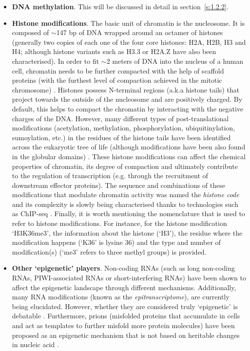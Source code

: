 \begin{itemize}
	
	\item \textbf{DNA methylation}. This will be discussed in detail in section~\ref{s:1.2.2}.
	
	\item \textbf{Histone modifications}. The basic unit of chromatin is the nucleosome. It is composed of $\sim$147 \acrshort{bp} of DNA wrapped around an octamer of histones (generally two copies of each one of the four core histones: H2A, H2B, H3 and H4; although histone variants such as H3.3 or H2A.Z have also been characterised). In order to fit  $\sim$2 meters of DNA into the nucleus of a human cell, chromatin needs to be further compacted with the help of scaffold proteins (with the furthest level of compaction achieved in the mitotic chromosome) \citep{Ou2017}. Histones possess N-terminal regions (a.k.a histone tails) that project towards the outside of the nucleosome and are positively charged. By default, this helps to compact the chromatin by interacting with the negative charges of the DNA. However, many different types of post-translational modifications (acetylation, methylation, phosphorylation, ubiquitinylation, sumoylation, etc.) in the residues of the histone tails have been identified across the eukaryotic tree of life (although modifications have been also found in the globular domains) \citep{Lawrence2016}. These histone modifications can affect the chemical properties of chromatin, its degree of compaction and ultimately contribute to the regulation of transcription (e.g. through the recruitment of downstream effector proteins). The sequence and combinations of these modifications that modulate chromatin activity was named the \textit{histone code} \citep{Strahl2000} and its complexity is slowly being characterised thanks to technologies such as \acrshort{ChIP-seq} \citep{Consortium2012, Consortium2015}. Finally, it is worth mentioning the nomenclature that is used to refer to histone modifications. For instance, for the histone modification `H3K36me3', the information about the histone (`H3'), the residue where the modification happens (`K36' is lysine 36) and the type and number of modification(s) (`me3' refers to three methyl groups) is provided.

	\item \textbf{Other `epigenetic' players}. Non-coding RNAs (such as long non-coding RNAs, PIWI-associated RNAs or short-interfering RNAs) have been shown to affect the epigenetic landscape through different mechanisms. Additionally, many RNA modifications (known as the \textit{epitranscriptome}), are currently being elucidated. However, whether they are considered truly `epigenetic' is debatable \citep{Mattick2009,Morris2014}. Furthermore, prions (misfolded proteins that accumulate in cells and act as templates to further misfold more protein molecules) have been proposed as an epigenetic mechanism that is not based on heritable changes in nucleic acid \citep{Halfmann2010}.
	
	
\end{itemize}

